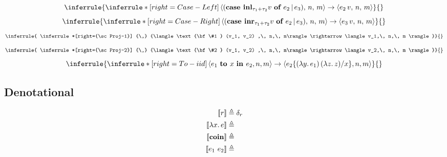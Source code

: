 \documentclass{article}
\begin{document}
\begin{multicols}{2}
				\begin{equation*}
				\inferrule{
				\inferrule*[right={\sc Case-Left}]
				{\,}
				{\langle (\text{\bf case } {\bf inl}_{\tau_1 + \tau_2} v \text{ \bf of } e_2 \,|\, e_3) ,\, n,\, m\rangle \rightarrow \langle e_2\, v,\, n,\, m \rangle}}
				{}
			\end{equation*}
				\begin{equation*}
				\inferrule{
				\inferrule*[right={\sc Case-Right}]
				{\,}
				{\langle (\text{\bf case } {\bf inr}_{\tau_1 + \tau_2} v \text{ \bf of } e_2 \,|\, e_3) ,\, n,\, m\rangle \rightarrow \langle e_3\, v,\, n,\, m \rangle}}
				{}
			\end{equation*}
				\begin{equation*}
				\inferrule{
				\inferrule*[right={\sc Proj-1}]
				{\,}
				{\langle \text{\bf \#1 } (v_1, v_2) ,\, n,\, m\rangle \rightarrow \langle v_1,\, n,\, m \rangle}}
				{}
			\end{equation*}
				\begin{equation*}
				\inferrule{
				\inferrule*[right={\sc Proj-2}]
				{\,}
				{\langle \text{\bf \#2 } (v_1, v_2) ,\, n,\, m\rangle \rightarrow \langle v_2,\, n,\, m \rangle}}
				{}
			\end{equation*}
			\begin{equation*}
				\inferrule{
				\inferrule*[right={\sc To-iid}]
				{\,}
				{\langle e_1 \text{ \bf to } x \text{ \bf in } e_2, n, m \rangle \to 
				\langle e_2 \{ (\lambda y.\, e_1) \, (\lambda z.\, z) / x \}, n, m \rangle}}
				{}
			\end{equation*}
		\end{multicols}
		
	\subsection{Denotational}
		\begin{equation*}
		\begin{split}
			[\![r]\!] &\triangleq \delta_r \\
			[\![\lambda x.\, e]\!] &\triangleq  \\
			[\![{\bf coin}]\!] &\triangleq \\
			[\![e_1 \text{ } e_2]\!] &\triangleq \\
		\end{split}
	\end{equation*}
\end{document}
